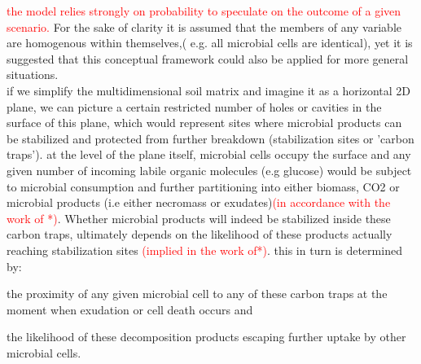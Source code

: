 \documentclass[12pt]{report}
\newcommand{\myRed}[1]{\textcolor{red}{#1}} %
\begin{document}
			\myRed{the model relies strongly on probability to speculate on the outcome of a given scenario.}
			For the sake of clarity it is assumed that the members of any variable are homogenous within themselves,( e.g. all microbial cells are identical), yet it is suggested that this conceptual framework could also be applied for more general situations.\\ 
			if we simplify the multidimensional soil matrix and imagine it as a horizontal 2D plane, we can picture a certain restricted number of holes or cavities in the surface of this plane, which would represent sites where microbial products can be stabilized and protected from further breakdown (stabilization sites or 'carbon traps'). at the level of the plane itself, microbial cells occupy the surface and any given number of incoming labile organic molecules (e.g glucose) would be subject to microbial consumption and further partitioning into either biomass, CO2 or microbial products (i.e either necromass or exudates)\myRed{(in accordance with the work of *)}. Whether microbial products will indeed be stabilized inside these carbon traps, ultimately depends on the likelihood of these products actually reaching stabilization sites \myRed{(implied in the work of*)}. this in turn is determined by:
			\begin{enumerate*}[label=(\arabic*)]
				\item the proximity of any given microbial cell to any of these carbon traps at the moment when exudation or cell death occurs and
				\item the likelihood of these decomposition products escaping further uptake by other microbial cells. 
			\end{enumerate*}
\end{document}
